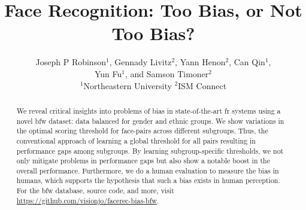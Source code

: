 \documentclass[10pt,twocolumn,letterpaper]{article}
\begin{document}
\title{Face Recognition: Too Bias, or Not Too Bias?}

\author{\parbox{16cm}{\centering
    {\large Joseph P Robinson$^1$, Gennady Livitz$^2$, Yann Henon$^2$, Can Qin$^1$,\\ Yun Fu$^1$, and Samson Timoner$^2$}\\
    {\normalsize
    \hspace{-.4in}$^{1}$Northeastern University\hspace{.7in} $^{2}$ISM Connect}}
}


\maketitle

\begin{abstract}
We reveal critical insights into problems of bias in state-of-the-art \gls{fr} systems using a novel \gls{bfw} dataset: data balanced for gender and ethnic groups. We show variations in the optimal scoring threshold for face-pairs across different subgroups. Thus, the conventional approach of learning a  global threshold for all pairs resulting in performance gaps among subgroups. By learning subgroup-specific thresholds, we not only mitigate problems in performance gaps but also show a notable boost in the overall performance. Furthermore, we do a human evaluation to measure the bias in humans, which supports the hypothesis that such a bias exists in human perception. For the \gls{bfw} database, source code, and more, visit \href{https://github.com/visionjo/facerec-bias-bfw}{https://github.com/visionjo/facerec-bias-bfw}.
\end{abstract}
\end{document}
